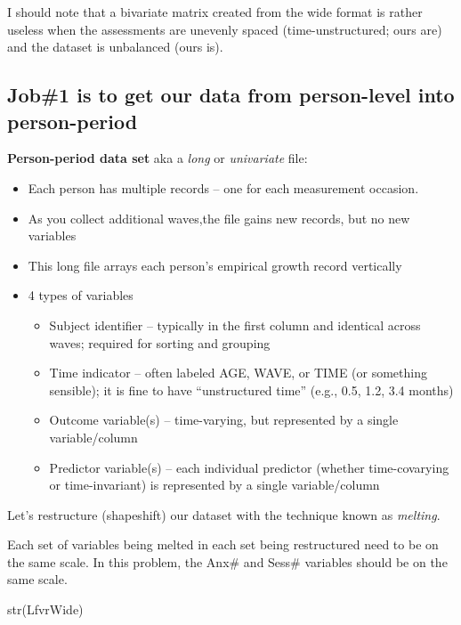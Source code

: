 \documentclass[
  11pt,
]{book}
\newenvironment{Shaded}{\begin{snugshade}}{\end{snugshade}}
\newcommand{\FunctionTok}[1]{\textcolor[rgb]{0.00,0.00,0.00}{#1}}
\newcommand{\NormalTok}[1]{#1}
\providecommand{\tightlist}{%
  \setlength{\itemsep}{0pt}\setlength{\parskip}{0pt}}
\begin{document}
I should note that a bivariate matrix created from the wide format is rather useless when the assessments are unevenly spaced (time-unstructured; ours are) and the dataset is unbalanced (ours is).

\hypertarget{job1-is-to-get-our-data-from-person-level-into-person-period}{%
\subsection{Job\#1 is to get our data from person-level into person-period}\label{job1-is-to-get-our-data-from-person-level-into-person-period}}

\textbf{Person-period data set} aka a \emph{long} or \emph{univariate} file:

\begin{itemize}
\tightlist
\item
  Each person has multiple records -- one for each measurement occasion.
\item
  As you collect additional waves,the file gains new records, but no new variables
\item
  This long file arrays each person's empirical growth record vertically
\item
  4 types of variables

  \begin{itemize}
  \tightlist
  \item
    Subject identifier -- typically in the first column and identical across waves; required for sorting and grouping
  \item
    Time indicator -- often labeled AGE, WAVE, or TIME (or something sensible); it is fine to have ``unstructured time'' (e.g., 0.5, 1.2, 3.4 months)
  \item
    Outcome variable(s) -- time-varying, but represented by a single variable/column
  \item
    Predictor variable(s) -- each individual predictor (whether time-covarying or time-invariant) is represented by a single variable/column
  \end{itemize}
\end{itemize}

Let's restructure (shapeshift) our dataset with the technique known as \emph{melting}.

Each set of variables being melted in each set being restructured need to be on the same scale. In this problem, the Anx\# and Sess\# variables should be on the same scale.

\begin{Shaded}
\begin{Highlighting}[]
\FunctionTok{str}\NormalTok{(LfvrWide)}
\end{Highlighting}
\end{Shaded}
\end{document}
